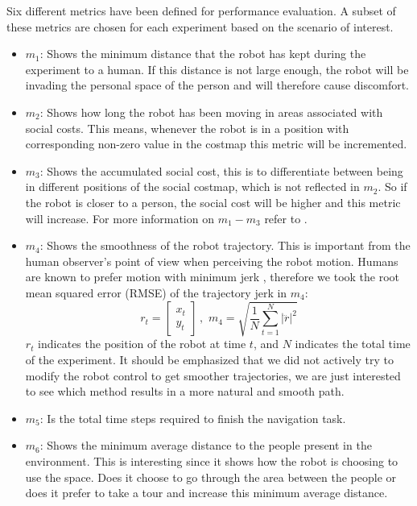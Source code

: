 Six different metrics have been defined for performance evaluation. A subset of these metrics are chosen for each experiment based on the scenario of interest.%



\begin{itemize}

\item $m_{1}$: Shows the minimum distance that the robot has kept during the experiment to a human. If this distance is not large enough, the robot will be invading the personal space of the person and will therefore cause discomfort. 


\item $m_{2}$: Shows how long the robot has been moving in areas associated with social costs. This means, whenever the robot is in a position with corresponding non-zero value in the costmap this metric will be incremented.

 \item $m_{3}$: Shows the accumulated social cost, this is to differentiate between being in different positions of the social costmap, which is not reflected in $m_{2}$.
 So if the robot is closer to a person, the social cost will be higher and this metric will increase. For more information on $m_{1}-m_{3}$ refer to \cite{talebpour2015board}. 

\item  $m_{4}$: Shows the smoothness of the robot trajectory. This is important from the human observer's point of view when perceiving the robot motion. Humans are known to prefer motion with minimum jerk \cite{sisbot2010synthesizing}, therefore we took the root mean squared error (RMSE) of the trajectory jerk in $m_{4}$:
\begin{equation}
r_{t} = \begin{bmatrix}
x_{t}\\
y_{t} 

\end{bmatrix} \, , \, \,  m_{4} = \sqrt{\frac{1}{N} \sum_{t=1}^{N}\left | \dddot{r} \right |^{2}  }
\end{equation}
$r_{t}$ indicates the position of the robot at time $t$, and $N$ indicates the total time of the experiment. It should be emphasized that we did not actively try to modify the robot control to get smoother trajectories, we are just interested to see which method results in a more natural and smooth path.  

\item $m_{5}$: Is the total time steps required to finish the navigation task.


\item $m_{6}$: Shows the minimum average distance to the people present in the environment. This is interesting since it shows how the robot is choosing to use the space. Does it choose to go through the area between the people or does it prefer to take a tour and increase this minimum average distance.

\end{itemize}

